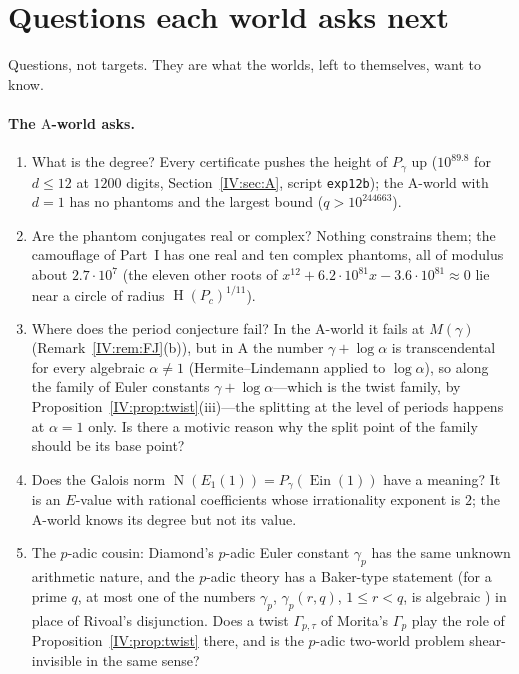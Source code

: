 \documentclass[11pt,a4paper]{article}
\newcommand{\Ein}{\operatorname{Ein}}
\DeclareMathOperator{\Ht}{H}
\DeclareMathOperator{\Nm}{N}
\theoremstyle{definition}
\theoremstyle{remark}
\numberwithin{equation}{section}
\begin{document}
\section{Questions each world asks next}\label{IV:sec:questions}

Questions, not targets. They are what the worlds, left to themselves, want to know.

\paragraph{The $\mathrm A$-world asks.}
\begin{enumerate}[label=(A\arabic*)]
\item What is the degree? Every certificate pushes the height of $P_\gamma$ up
($10^{89.8}$ for $d\le12$ at $1200$ digits, Section~\ref{IV:sec:A}, script \texttt{exp12b}); the
$\mathrm A$-world with $d=1$ has no phantoms and the largest bound ($q>10^{244663}$).
\item Are the phantom conjugates real or complex? Nothing constrains them; the camouflage
of Part~I has one real and ten complex phantoms, all of modulus about $2.7\cdot10^7$
(the eleven other roots of $x^{12}+6.2\cdot10^{81}x-3.6\cdot10^{81}\approx0$ lie near a
circle of radius $\Ht(P_c)^{1/11}$).
\item Where does the period conjecture fail? In the $\mathrm A$-world it fails at
$M(\gamma)$ (Remark~\ref{IV:rem:FJ}(b)), but in $\mathrm A$ the number $\gamma+\log\alpha$ is
transcendental for every algebraic $\alpha\ne1$ (Hermite--Lindemann applied to
$\log\alpha$), so along the family of Euler constants
$\gamma+\log\alpha$---which is the twist family, by Proposition~\ref{IV:prop:twist}(iii)---the
splitting at the level of periods happens at $\alpha=1$ only. Is there a motivic reason why
the split point of the family should be its base point?
\item Does the Galois norm $\Nm(E_1(1))=P_\gamma(\Ein(1))$ have a meaning? It is an
$E$-value with rational coefficients whose irrationality exponent is $2$; the
$\mathrm A$-world knows its degree but not its value.
\item The $p$-adic cousin: Diamond's $p$-adic Euler constant $\gamma_p$ has the same
unknown arithmetic nature, and the $p$-adic theory has a Baker-type statement (for a prime
$q$, at most one of the numbers $\gamma_p$, $\gamma_p(r,q)$, $1\le r<q$, is algebraic
\cite{MurtySaradha}) in place of Rivoal's disjunction.
Does a twist $\Gamma_{p,\tau}$ of Morita's $\Gamma_p$ play the role of
Proposition~\ref{IV:prop:twist} there, and is the $p$-adic two-world problem shear-invisible in
the same sense?
\end{enumerate}
\end{document}
